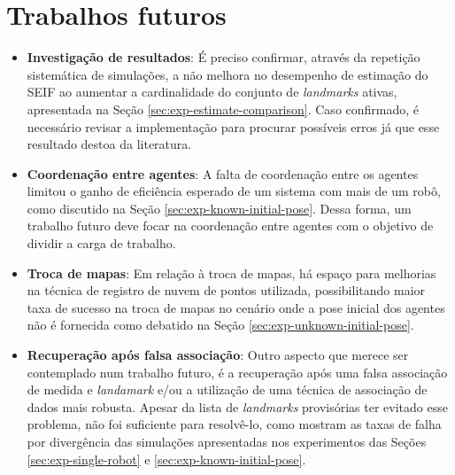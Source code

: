 \section{Trabalhos futuros}
\begin{itemize}
  \item \textbf{Investigação de resultados}: É preciso confirmar, através da 
  repetição sistemática de simulações, a não melhora no desempenho de estimação do SEIF ao aumentar a cardinalidade do conjunto de \textit{landmarks} ativas, apresentada na Seção \ref{sec:exp-estimate-comparison}. Caso confirmado, é necessário revisar a 
  implementação para procurar possíveis erros já que esse resultado 
  destoa da literatura.
  \item \textbf{Coordenação entre agentes}: A falta de 
coordenação entre os agentes limitou o ganho de eficiência esperado de 
um sistema com mais de um robô, como discutido na Seção \ref{sec:exp-known-initial-pose}. Dessa forma, um trabalho futuro deve focar na coordenação entre agentes com o objetivo de dividir a carga de trabalho.
  \item \textbf{Troca de mapas}: Em relação à troca de mapas, há espaço para melhorias na técnica de registro de nuvem de pontos utilizada, possibilitando maior taxa de sucesso na troca de mapas 
no cenário onde a pose inicial dos agentes não é fornecida como debatido na Seção \ref{sec:exp-unknown-initial-pose}. 
  \item \textbf{Recuperação após falsa associação}: Outro aspecto que merece ser contemplado num trabalho futuro, é a recuperação após uma falsa associação de medida e \textit{landamark} e/ou a 
utilização de uma técnica de associação de dados mais robusta. Apesar da 
lista de \textit{landmarks} provisórias ter evitado esse problema, não foi 
suficiente para resolvê-lo, como mostram as taxas de falha por divergência das 
simulações apresentadas nos experimentos das Seções \ref{sec:exp-single-robot}  e \ref{sec:exp-known-initial-pose}.
\end{itemize}




